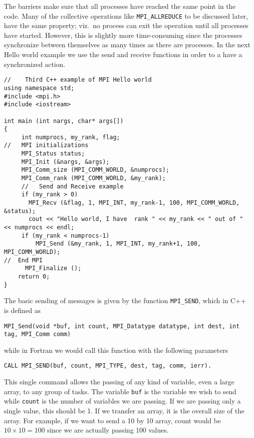 The barriers make sure that all processes have reached the same point in the code. Many of the collective operations
like \lstinline{MPI_ALLREDUCE} to be discussed later, have the same property; viz.~no process can exit the operation
until all processes have started. 
However, this is slightly more time-consuming since the processes synchronize between themselves as many times as there
are processes.  In the next Hello world example we use the send and receive functions in order to a have a synchronized
action.
\lstset{language=c++}
\begin{lstlisting}[title={\url{http://folk.uio.no/mhjensen/compphys/programs/chapter05/program4.cpp}}]
//    Third C++ example of MPI Hello world
using namespace std;
#include <mpi.h>
#include <iostream>

int main (int nargs, char* args[])
{
     int numprocs, my_rank, flag;
//   MPI initializations
     MPI_Status status;
     MPI_Init (&nargs, &args);
     MPI_Comm_size (MPI_COMM_WORLD, &numprocs);
     MPI_Comm_rank (MPI_COMM_WORLD, &my_rank);
     //   Send and Receive example
     if (my_rank > 0)
       MPI_Recv (&flag, 1, MPI_INT, my_rank-1, 100, MPI_COMM_WORLD, &status);
       cout << "Hello world, I have  rank " << my_rank << " out of " << numprocs << endl;
     if (my_rank < numprocs-1)
         MPI_Send (&my_rank, 1, MPI_INT, my_rank+1, 100, MPI_COMM_WORLD);
//  End MPI
      MPI_Finalize ();
    return 0;
}
\end{lstlisting}
The basic sending of messages is given by the function \lstinline{MPI_SEND}, which in C++
is defined as 
\begin{lstlisting}
MPI_Send(void *buf, int count, MPI_Datatype datatype, int dest, int tag, MPI_Comm comm)
\end{lstlisting}
while in Fortran we would call this function with the following parameters
\begin{lstlisting}
CALL MPI_SEND(buf, count, MPI_TYPE, dest, tag, comm, ierr).
\end{lstlisting}
This single command allows the passing of any kind of variable, even a large array, to any group of tasks. 
The variable \lstinline{buf} is the variable we wish to send while \lstinline{count} 
is the  number of variables we are passing. If we are passing only a single value, this should be 1. 
If we transfer an array, it is  the overall size of the array. 
For example, if we want to send a 10 by 10 array, count would be $10\times 10=100$ 
since we are  actually passing 100 values.  

